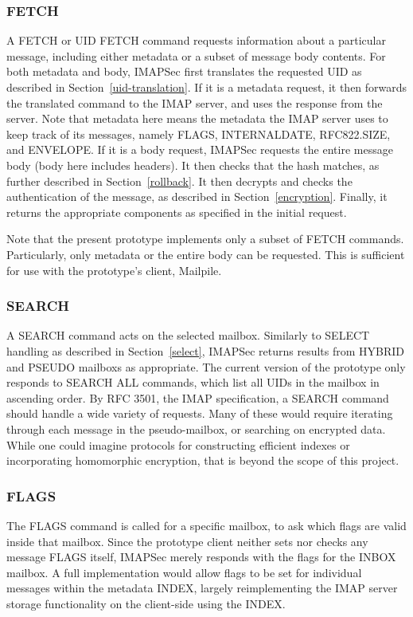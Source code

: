 \documentclass[pageno]{jpaper}
\newcommand{\project}{IMAPSec }
\begin{document}
\subsubsection{FETCH} A FETCH or UID FETCH command requests information about a particular message, including either metadata or a subset of message body contents. For both metadata and body, \project first translates the requested UID as described in Section~\ref{uid-translation}. If it is a metadata request, it then forwards the translated command to the IMAP server, and uses the response from the server. Note that metadata here means the metadata the IMAP server uses to keep track of its messages, namely FLAGS, INTERNALDATE, RFC822.SIZE, and ENVELOPE. If it is a body request, \project requests the entire message body (body here includes headers). It then checks that the hash matches, as further described in Section~\ref{rollback}. It then decrypts and checks the authentication of the message, as described in Section~\ref{encryption}. Finally, it returns the appropriate components as specified in the initial request.


Note that the present prototype implements only a subset of FETCH commands. Particularly, only metadata or the entire body can be requested. This is sufficient for use with the prototype's client, Mailpile.

\subsubsection{SEARCH} A SEARCH command acts on the selected mailbox. Similarly to SELECT handling as described in Section~\ref{select}, \project returns results from HYBRID and PSEUDO mailboxs as appropriate. The current version of the prototype only responds to SEARCH ALL commands, which list all UIDs in the mailbox in ascending order. By RFC 3501, the IMAP specification, a SEARCH command should handle a wide variety of requests. Many of these would require iterating through each message in the pseudo-mailbox, or searching on encrypted data. While one could imagine protocols for constructing efficient indexes or incorporating homomorphic encryption, that is beyond the scope of this project.

\subsubsection{FLAGS} The FLAGS command is called for a specific mailbox, to ask which flags are valid inside that mailbox. Since the prototype client neither sets nor checks any message FLAGS itself, \project merely responds with the flags for the INBOX mailbox. A full implementation would allow flags to be set for individual messages within the metadata INDEX, largely reimplementing the IMAP server storage functionality on the client-side using the INDEX.
\end{document}
